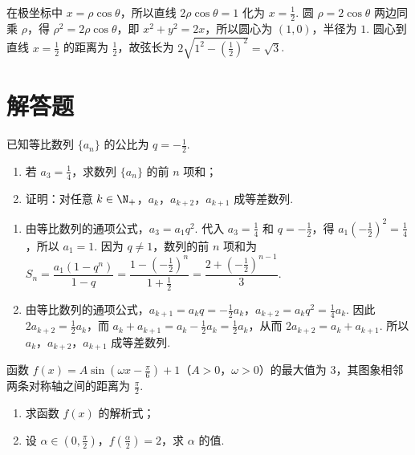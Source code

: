 \begin{solution}
在极坐标中 \(x=\rho\cos\theta\)，所以直线 \(2\rho\cos\theta=1\) 化为 \(x=\frac{1}{2}\). 圆 \(\rho=2\cos\theta\) 两边同乘 \(\rho\)，得 \(\rho^2=2\rho\cos\theta\)，即 \(x^2+y^2=2x\)，所以圆心为 \((1,0)\)，半径为 \(1\). 圆心到直线 \(x=\frac{1}{2}\) 的距离为 \(\frac{1}{2}\)，故弦长为 \(2\sqrt{1^2-\left(\frac{1}{2}\right)^2}=\sqrt3\).
\end{solution}

\section{解答题}

\begin{problem}
已知等比数列 \(\{a_n\}\) 的公比为 \(q = -\frac{1}{2}\).

\begin{enumerate}
\item 若 \(a_3 = \frac{1}{4}\)，求数列 \(\{a_n\}\) 的前 \(n\) 项和；
\item 证明：对任意 \(k \in \N_+\)，\(a_k\)，\(a_{k+2}\)，\(a_{k+1}\) 成等差数列.
\end{enumerate}
\end{problem}

\begin{solution}
\begin{enumerate}
\item 由等比数列的通项公式，\(a_3=a_1q^2\). 代入 \(a_3=\frac{1}{4}\) 和 \(q=-\frac{1}{2}\)，得 \(a_1\left(-\frac{1}{2}\right)^2=\frac{1}{4}\)，所以 \(a_1=1\). 因为 \(q\ne1\)，数列的前 \(n\) 项和为
\(S_n=\dfrac{a_1\left(1-q^n\right)}{1-q}=\dfrac{1-\left(-\frac{1}{2}\right)^n}{1+\frac{1}{2}}=\dfrac{2+\left(-\frac{1}{2}\right)^{n-1}}{3}\).

\item 由等比数列的通项公式，\(a_{k+1}=a_kq=-\frac{1}{2}a_k\)，\(a_{k+2}=a_kq^2=\frac{1}{4}a_k\). 因此 \(2a_{k+2}=\frac{1}{2}a_k\)，而 \(a_k+a_{k+1}=a_k-\frac{1}{2}a_k=\frac{1}{2}a_k\)，从而 \(2a_{k+2}=a_k+a_{k+1}\). 所以 \(a_k\)，\(a_{k+2}\)，\(a_{k+1}\) 成等差数列.
\end{enumerate}
\end{solution}

\begin{problem}
函数 \(f(x) = A \sin \left(\omega x - \frac{\pi}{6}\right) + 1\)（\(A > 0\)，\(\omega > 0\)）的最大值为 \(3\)，其图象相邻两条对称轴之间的距离为 \(\frac{\pi}{2}\).

\begin{enumerate}
\item 求函数 \(f(x)\) 的解析式；
\item 设 \(\alpha \in \left(0, \frac{\pi}{2}\right)\)，\(f\left(\frac{\alpha}{2}\right) = 2\)，求 \(\alpha\) 的值.
\end{enumerate}
\end{problem}


